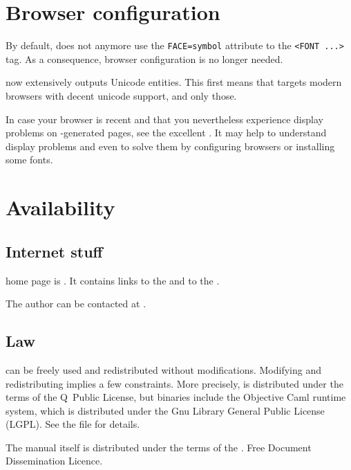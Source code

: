 \section{Browser \label{browser}configuration}
%
%
By default, \hevea{} does not anymore use the \verb+FACE=symbol+
attribute to the \verb+<FONT ...>+ tag.  As a consequence, browser
configuration is no longer needed.

%
\hevea{} now extensively outputs Unicode entities.
This first means that \hevea{} targets modern browsers with
decent unicode support, and only those.

In case your browser is recent and that you nevertheless experience display
problems on \hevea{}-generated pages, see the excellent
.
It may help to understand display  problems and even to solve them
by configuring browsers or installing some fonts.

\section{Availability}

\subsection{Internet stuff}

\hevea{} home page is \ahrefurl{\httpbase}. It contains links to the
and to the .

The author can be contacted at .

\subsection{Law}
\hevea{} can be freely used and redistributed without modifications.
Modifying and redistributing \hevea{} implies a few constraints.
More precisely, \hevea{} is distributed under the terms of the
Q~Public License, but \hevea{} binaries include the Objective Caml
runtime system, which is distributed under the Gnu Library General
Public License (LGPL).
See the  file for details.

The manual itself is distributed under the terms of
the
\ifhevea
{}.
\else
{}
{Free Document Dissemination Licence}.
\fi

